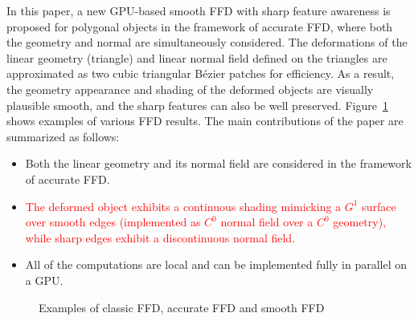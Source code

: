 \documentclass[3p]{elsarticle}
\begin{document}
In this paper, a new GPU-based smooth FFD with sharp feature awareness is proposed for polygonal objects in the
framework of accurate FFD, where both the geometry and normal are simultaneously considered. The deformations of the
linear geometry (triangle) and linear normal field defined on the triangles are approximated as two cubic triangular
B\'ezier patches for efficiency. As a result, the geometry appearance and shading of the deformed objects are visually
plausible smooth, and the sharp features can also be well preserved. Figure~\ref{fig:all_ffd} shows examples of various
FFD results. The main contributions of the paper are summarized as follows:

\begin{itemize}
	\item Both the linear geometry and its normal field are considered in the framework of accurate FFD.
	\item \textcolor{red}{The deformed object exhibits a continuous shading mimicking a $G^1$ surface over smooth edges
		(implemented as $C^0$ normal field over a $C^0$ geometry), while sharp edges exhibit a discontinuous normal field.}
	\item All of the computations are local and can be implemented fully in parallel on a GPU.
\end{itemize}

\begin{figure}[htb]
	\centering
	\caption{Examples of classic FFD, accurate FFD and smooth FFD}
	\label{fig:all_ffd}
\end{figure}
\end{document}
